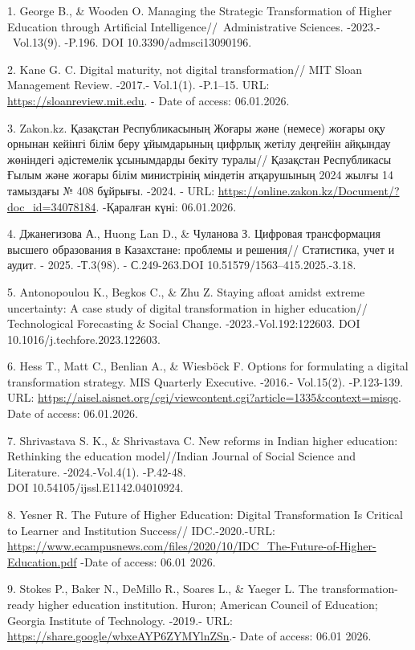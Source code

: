 \begin{refs}
1. George B., \& Wooden O. Managing the Strategic Transformation of
Higher Education through Artificial Intelligence//~Administrative
Sciences. -2023.-~Vol.13(9). -P.196. DOI 10.3390/admsci13090196.

2. Kane G. C. Digital maturity, not digital transformation// MIT Sloan
Management Review. -2017.- Vol.1(1). -P.1--15. URL:
\href{https://sloanreview.mit.edu/article/digital-maturity-not-digital-transformation}{https://sloanreview.mit.edu}.
- Date of access: 06.01.2026.

3. Zakon.kz. Қазақстан Республикасының Жоғары және (немесе) жоғары оқу
орнынан кейінгі білім беру ұйымдарының цифрлық жетілу деңгейін айқындау
жөніндегі әдістемелік ұсынымдарды бекіту туралы// Қазақстан Республикасы
Ғылым және жоғары білім министрінің міндетін атқарушының 2024 жылғы 14
тамыздағы № 408 бұйрығы. -2024. -
URL: \url{https://online.zakon.kz/Document/?doc_id=34078184}. -Қаралған
күні: 06.01.2026.

4. Джанегизова А., Huong Lan D., \& Чуланова З. Цифровая трансформация
высшего образования в Казахстане: проблемы и решения// Статистика, учет
и аудит\emph{.} - 2025. -Т.3(98). - С.249-263.DOI
10.51579/1563--415.2025.-3.18.

5. Antonopoulou K., Begkos C., \& Zhu Z. Staying afloat amidst extreme
uncertainty: A case study of digital transformation in higher
education// Technological Forecasting \& Social Change.
-2023.-Vol.192:122603. DOI 10.1016/j.techfore.2023.122603.

6. Hess T., Matt C., Benlian A., \& Wiesböck F. Options for formulating
a digital transformation strategy. MIS Quarterly Executive. -2016.-
Vol.15(2). -P.123-139. URL:
\url{https://aisel.aisnet.org/cgi/viewcontent.cgi?article=1335&context=misqe}.
Date of access: 06.01.2026.

7. Shrivastava S. K., \& Shrivastava C. New reforms in Indian higher
education: Rethinking the education model//Indian Journal of Social
Science and Literature. -2024.-Vol.4(1). -P.42-48.\\
DOI 10.54105/ijssl.E1142.04010924.

8. Yesner R. The Future of Higher Education: Digital Transformation Is
Critical to Learner and Institution Success// IDC.-2020.-URL:\\
\url{https://www.ecampusnews.com/files/2020/10/IDC_The-Future-of-Higher-Education.pdf}
-Date of access: 06.01 2026.

9. Stokes P., Baker N., DeMillo R., Soares L., \& Yaeger L. The
transformation-ready higher education institution. Huron; American
Council of Education; Georgia Institute of Technology. -2019.- URL:
\url{https://share.google/wbxeAYP6ZYMYlnZSn}.- Date of access: 06.01
2026.


\end{refs}
